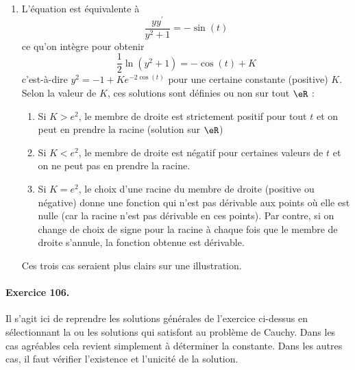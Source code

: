 \begin{enumerate}
\item L'équation est équivalente à
\begin{equation*}
\frac{yy^\prime}{y^2+1} = - \sin(t)
\end{equation*}
ce qu'on intègre pour obtenir
\begin{equation*}
\frac12\ln(y^2 + 1) = - \cos(t) + K
\end{equation*}
c'est-à-dire $y^2 = -1 + K e^{-2 \cos(t)}$ pour une certaine
constante (positive) $K$. Selon la valeur de $K$, ces solutions sont
définies ou non sur tout $\eR$ :
\begin{enumerate}
\item Si $K > e^{2}$, le membre de droite est strictement positif
pour tout $t$ et on peut en prendre la racine (solution sur $\eR$)
\item Si $K < e^{2}$, le membre de droite est négatif pour
certaines valeurs de $t$ et on ne peut pas en prendre la racine.
\item Si $K = e^{2}$, le choix d'une racine du membre de droite
(positive ou négative) donne une fonction qui n'est pas dérivable
aux points où elle est nulle (car la racine n'est pas dérivable en
ces points). Par contre, si on change de choix de signe pour la
racine à chaque fois que le membre de droite s'annule, la fonction
obtenue est dérivable.
\end{enumerate}

Ces trois cas seraient plus clairs sur une illustration.



\end{enumerate}

\paragraph{Exercice 106.}
Il s'agit ici de reprendre les solutions générales de l'exercice
ci-dessus en sélectionnant la ou les solutions qui satisfont au
problème de Cauchy. Dans les cas agréables cela revient simplement à
déterminer la constante. Dans les autres cas, il faut vérifier
l'existence et l'unicité de la solution.


